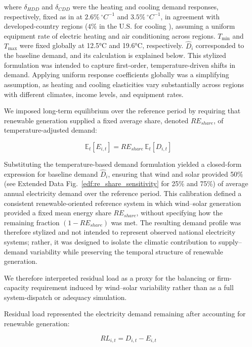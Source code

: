 \documentclass[pdflatex,sn-mathphys-num]{sn-jnl}%
\begin{document}
where $\delta_{HDD}$ and $\delta_{CDD}$ were the heating and cooling demand responses, respectively, fixed as in \cite{zhengStrategiesClimateresilientGlobal2025} at $2.6\%\ ^\circ C^{-1}$ and $3.5\%\ ^\circ C^{-1}$, in agreement with developed-country regions ($4\%$ in the U.S. for cooling \cite{EIA2021AC}), assuming a uniform equipment rate of electric heating and air conditioning across regions. $T_{\text{min}}$ and $T_{\text{max}}$ were fixed globally at 12.5°C and 19.6°C, respectively. $\hat D_i$ corresponded to the baseline demand, and its calculation is explained below. This stylized formulation was intended to capture first-order, temperature-driven shifts in demand. Applying uniform response coefficients globally was a simplifying assumption, as heating and cooling elasticities vary substantially across regions with different climates, income levels, and equipment rates. 

We imposed long-term equilibrium over the reference period by requiring that renewable generation supplied a fixed average share, denoted $RE_{share}$, of temperature-adjusted demand:

\begin{equation}
    \mathbb{E}_t[E_{i,t}] = RE_{share} \, \mathbb{E}_t\![D_{i,t}]
\end{equation}

Substituting the temperature-based demand formulation yielded a closed-form expression for baseline demand $\hat D_i$, ensuring that wind and solar provided 50\% (see Extended Data Fig.~\ref{edf:re_share_sensitivity} for 25\% and 75\%) of average annual electricity demand over the reference period. This calibration defined a consistent renewable-oriented reference system in which wind–solar generation provided a fixed mean energy share $RE_{share}$, without specifying how the remaining fraction $(1-RE_{share})$ was met. The resulting demand profile was therefore stylized and not intended to represent observed national electricity systems; rather, it was designed to isolate the climatic contribution to supply–demand variability while preserving the temporal structure of renewable generation.

We therefore interpreted residual load as a proxy for the balancing or firm-capacity requirement induced by wind–solar variability rather than as a full system-dispatch or adequacy simulation.

Residual load represented the electricity demand remaining after accounting for renewable generation:

\begin{equation}
    RL_{i,t} = D_{i,t}-E_{i,t}
\end{equation} \label{eq:RL}
\end{document}
